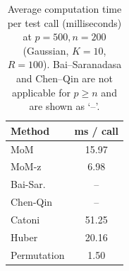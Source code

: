 \begin{table}[t]
\centering\small
\caption{Average computation time per test call (milliseconds) at $p=500, n=200$ (Gaussian, $K=10$, $R=100$). Bai--Saranadasa and Chen--Qin are not applicable for $p\ge n$ and are shown as `--'.}
\label{tab:timing}
\begin{tabular}{lc}
\toprule
Method & ms / call \\
\midrule
MoM & 15.97 \\
MoM-z & 6.98 \\
Bai-Sar. & -- \\
Chen-Qin & -- \\
Catoni & 51.25 \\
Huber & 20.16 \\
Permutation & 1.50 \\
\bottomrule
\end{tabular}
\end{table}